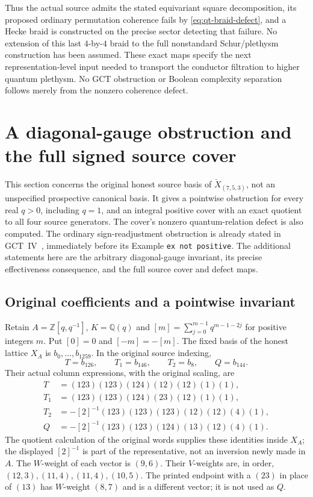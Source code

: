 Thus the actual source admits the stated equivariant square
decomposition, its proposed ordinary permutation coherence fails
by \eqref{eq:qt-braid-defect}, and a Hecke braid is constructed
on the precise sector detecting that failure. No extension of this
last $4$-by-$4$ braid to the full nonstandard Schur/plethysm
construction has been assumed. These exact maps specify the next
representation-level input needed to transport the conductor
filtration to higher quantum plethysm. No GCT obstruction or
Boolean complexity separation follows merely from the nonzero
coherence defect.

\section{A diagonal-gauge obstruction and the full signed source cover}
\label{sec:positive-source-cover}

This section concerns the original honest source basis of
$\check X_{(7,5,3)}$, not an unspecified prospective canonical basis.
It gives a pointwise obstruction for every real $q>0$, including $q=1$,
and an integral positive cover with an exact quotient to all four source
generators. The cover's nonzero quantum-relation defect is also computed.
The ordinary sign-readjustment obstruction is already stated in
GCT~IV~\cite{blasiakmulmuleysohoni2013gct4}, immediately before its
Example \texttt{ex not positive}. The additional statements here are
the arbitrary diagonal-gauge invariant, its precise effectiveness
consequence, and the full source cover and defect maps.

\subsection{Original coefficients and a pointwise invariant}

Retain $A=\mathbb Z[q,q^{-1}]$, $K=\mathbb Q(q)$ and
$[m]=\sum_{j=0}^{m-1}q^{m-1-2j}$ for positive integers $m$.
Put $[0]=0$ and $[-m]=-[m]$. The fixed basis of the honest lattice
$X_A$ is $b_0,\ldots,b_{1259}$. In the original source indexing,
\[
 T=b_{126},\qquad T_1=b_{146},\qquad T_2=b_8,\qquad Q=b_{144}.
\]
Their actual column expressions, with the original scaling, are
\begin{align*}
 T&=(123)(123)(124)(12)(12)(1)(1),\\
 T_1&=(123)(123)(124)(23)(12)(1)(1),\\
 T_2&=-[2]^{-1}(123)(123)(123)(12)(12)(4)(1),\\
 Q&=-[2]^{-1}(123)(123)(124)(13)(12)(4)(1).
\end{align*}
The quotient calculation of the original words supplies these identities
inside $X_A$; the displayed $[2]^{-1}$ is part of the representative,
not an inversion newly made in $A$. The $W$-weight of each vector is
$(9,6)$. Their $V$-weights are, in order, $(12,3),(11,4),(11,4),(10,5)$.
The printed endpoint with a $(23)$ in place of $(13)$ has $W$-weight
$(8,7)$ and is a different vector; it is not used as $Q$.

